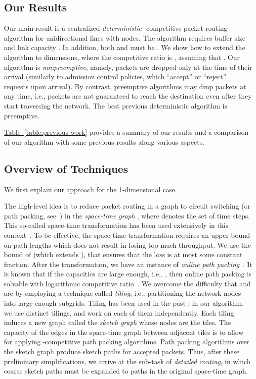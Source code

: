 \documentclass[11pt]{article}
\newcommand{\namedref}[2]{\hyperref[#2]{#1~\ref*{#2}}}
\newcommand{\tableref}[1]{\namedref{Table}{#1}}
\newenvironment{proof sketch}[1]{\noindent {\emph{Proof sketch of #1:}}}{\hfill \qed}
\begin{document}
\subsection{Our Results}
Our main result is a centralized \emph{deterministic} -competitive packet routing algorithm for
unidirectional lines with  nodes. The algorithm requires buffer size  and link capacity . In
addition, both  and  must be . We show how to extend the
algorithm to  dimensions, where the competitive ratio is ,
assuming that . Our algorithm is \emph{nonpreemptive}, namely,
packets are dropped only at the time of their arrival (similarly to admission control
policies, which ``accept'' or ``reject'' requests upon arrival). By contrast,
{preemptive} algorithms may drop packets at any time, i.e., packets are not
guaranteed to reach the destination even after they start traversing the
network. The best previous deterministic algorithm \cite{DBLP:conf/spaa/EvenM11,EM14} is
preemptive.

\tableref{table:previous work} provides  a summary of our
results and a comparison of our algorithm with some
previous results along various aspects.


\newpage
\subsection{Overview of Techniques}\label{sec:tech}


We first explain
our approach  for the 1-dimensional case.


The high-level idea is to reduce packet routing in a graph
 to circuit switching (or path packing,
see~\cite{KT,AAP}) in the \emph{space-time graph}  , where  denotes the set of time steps. This so-called
{space-time transformation} has been used extensively in
this context~\cite{AAF,ARSU,AZ,RR,
DBLP:conf/icalp/EvenM10,DBLP:conf/spaa/EvenM11,EM14}.
To be effective, the space-time
transformation requires an upper bound on path lengths which does not
result in losing too
much throughput. We use the bound of \cite{DBLP:conf/spaa/EvenM11, EM14}
(which extends \cite{AZ}),
that ensures that the loss is at most some constant fraction.
After the transformation, we have an instance of
\emph{online path packing}~\cite{AAP,
BN06}. It is known that if the capacities are
large enough, i.e., , then online path
packing is solvable with logarithmic competitive
ratio~\cite{AAP,DBLP:conf/icalp/EvenM10,DBLP:conf/spaa/EvenM11,EM14}. We overcome the difficulty that  and  are  by employing a technique
called \emph{tiling}, i.e., partitioning the network nodes into large enough subgrids.
Tiling has been used in the past
\cite{KT,BL,DBLP:conf/icalp/EvenM10,DBLP:conf/spaa/EvenM11,EM14}; in
our algorithm, we use  distinct tilings, and work on each of them independently.  Each tiling induces a new graph called the
\emph{sketch graph} whose nodes are the tiles. The capacity of the edges in the
space-time graph between adjacent tiles is  to allow for applying -competitive path packing algorithms.  Path packing algorithms over the sketch
graph produce sketch paths for accepted packets. Thus, after these preliminary
simplifications, we arrive at the sub-task of \emph{detailed routing}, in which
coarse sketch  paths must be expanded to paths in the original space-time graph.
\end{document}
